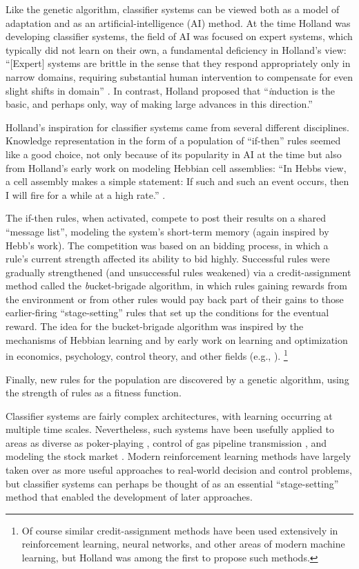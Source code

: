 \documentclass{sig-alternate}
\begin{document}
Like the genetic algorithm, classifier systems can be viewed both as a
model of adaptation and as an artificial-intelligence (AI) method.  At
the time Holland was developing classifier systems, the field of AI
was focused on expert systems, which typically did not learn on their
own, a fundamental deficiency in Holland's view: ``[Expert] systems
are brittle in the sense that they respond appropriately only in
narrow domains, requiring substantial human intervention to compensate
for even slight shifts in domain'' \cite{EscapingBrittleness}. In
contrast, Holland proposed that ``{\emph induction} is the basic, and
perhaps only, way of making large advances in this direction.''

Holland's inspiration for classifier systems came from several
different disciplines.  Knowledge representation in the form of a
population of ``if-then'' rules seemed like a good choice, not only
because of its popularity in AI at the time but also from Holland's
early work on modeling Hebbian cell assemblies: ``In Hebbs view, a
cell assembly makes a simple statement: If such and such an event
occurs, then I will fire for a while at a high
rate.'' \cite{Quoted-in-Waldrop-Book-P.182}.  

The if-then rules, when activated, compete to post their results on a
shared ``message list'', modeling the system's short-term memory
(again inspired by Hebb's work).  The competition was based on an
bidding process, in which a rule's current strength affected its
ability to bid highly.  Successful rules were gradually strengthened
(and unsuccessful rules weakened) via a credit-assignment method
called the {\emph bucket-brigade} algorithm, in which rules gaining
rewards from the environment or from other rules would pay back part
of their gains to those earlier-firing ``stage-setting'' rules that
set up the conditions for the eventual reward.  The idea for the
bucket-brigade algorithm was inspired by the mechanisms of Hebbian
learning and by early work on learning and optimization in economics,
psychology, control theory, and other fields (e.g.,
\cite{Bellman1957,Samuel1959}). \footnote{Of course similar
  credit-assignment methods have been used extensively in
  reinforcement learning, neural networks, and other areas of modern
  machine learning, but Holland was among the first to propose such
  methods.}

Finally, new rules for the population are discovered by a genetic
algorithm, using the strength of rules as a fitness function.

Classifier systems are fairly complex architectures, with learning
occurring at multiple time scales.  Nevertheless, such systems have
been usefully applied to areas as diverse as
poker-playing \cite{Smith1980}, control of gas pipeline
transmission \cite{Goldberg1983}, and modeling the stock
market \cite{PalmerEtAl}.  Modern reinforcement learning methods have
largely taken over as more useful approaches to real-world decision
and control problems, but classifier systems can perhaps be thought of
as an essential ``stage-setting'' method that enabled the development
of later approaches.
\end{document}
